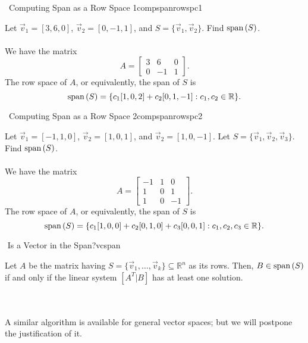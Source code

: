         \begin{example}{\Difficulty\,\Difficulty\,\,Computing Span as a Row Space 1}{compspanrowspc1}

            Let \(\vec{v}_1=[3,6,0]\), \(\vec{v}_2=[0,-1,1]\), and \(S=\{\vec{v}_1,\vec{v}_2\}\). Find \(\text{span\,}(S)\). 
            \\
            \\
            We have the matrix
            \begin{equation*}
                A=\begin{bmatrix}
                    3 & 6 & 0 \\
                    0 & -1 & 1
                \end{bmatrix}.
            \end{equation*}
            The row space of \(A\), or equivalently, the span of \(S\) is
            \begin{equation*}
                \text{span\,}(S)=\{c_1[1,0,2]+c_2[0,1,-1]:c_1,c_2\in\mathbb{R}\}.
            \end{equation*}
            
        \end{example}
        \begin{example}{\Difficulty\,\Difficulty\,\,Computing Span as a Row Space 2}{compspanrowspc2}

            Let \(\vec{v}_1=[-1,1,0]\), \(\vec{v}_2=[1,0,1]\), and \(\vec{v}_2=[1,0,-1]\). Let \(S=\{\vec{v}_1,\vec{v}_2,\vec{v}_3\}\). Find \(\text{span\,}(S)\). 
            \\
            \\
            We have the matrix
            \begin{equation*}
                A=\begin{bmatrix}
                    -1 & 1 & 0 \\
                    1 & 0 & 1 \\
                    1 & 0 & -1
                \end{bmatrix}.
            \end{equation*}
            The row space of \(A\), or equivalently, the span of \(S\) is
            \begin{equation*}
                \text{span\,}(S)=\{c_1[1,0,0]+c_2[0,1,0]+c_3[0,0,1]:c_1,c_2,c_3\in\mathbb{R}\}.
            \end{equation*}
            
        \end{example}
        \begin{theorem}{\Stop\,\,Is a Vector in the Span?}{vcspan}
            
            Let \(A\) be the matrix having \(S=\{\vec{v}_1,\ldots,\vec{v}_k\}\subseteq\mathbb{R}^n\) as its rows. Then, \(B\in\text{span\,}(S)\) if and only if the linear system \([A^T|B]\) has at least one solution.

        \end{theorem}
        \vphantom
        \\
        \\
        A similar algorithm is available for general vector spaces; but we will postpone the justification of it.
        

